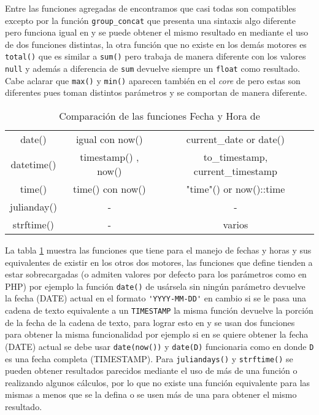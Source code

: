 Entre las funciones agregadas de \s encontramos que casi todas son compatibles excepto por la función \verb=group_concat= que presenta una sintaxis algo diferente pero funciona igual en \m y se puede obtener el mismo resultado en \p mediante el uso de dos funciones distintas, la otra función que no existe en los demás motores es \verb=total()= que es similar a \verb=sum()= pero  trabaja de manera diferente con los valores \verb=null= y además a diferencia de \verb=sum= devuelve siempre un \verb=float= como resultado. Cabe aclarar que \verb=max()= y \verb=min()= aparecen también en el \textit{core} de \s pero estas son diferentes pues toman distintos parámetros y se comportan de manera diferente.

\begin{table}[h]
\begin{center}
{
\selectfont
\begin{tabular}{|c|c|c|}
\hline 
\s & \m & \p \\ 
\hline 
date() & igual con now() & current\_date or date() \\ 
\hline 
datetime() & timestamp() , now() & to\_timestamp, current\_timestamp \\ 
\hline 
time() & time() con now() & "time"() or now()::time \\ 
\hline 
julianday() & - & - \\ 
\hline 
strftime() & - & varios \\ 
\hline 
\end{tabular} 
}
\end{center}
\caption{Comparación de las funciones Fecha y Hora de \s}
\label{table:functions:dates}
\end{table}

La tabla \ref{table:functions:dates} muestra las funciones que tiene \s para el manejo de fechas y horas y sus equivalentes de existir en los otros dos motores, las funciones que define \s tienden a estar sobrecargadas (o admiten valores por defecto para los parámetros como en PHP) por ejemplo la función \verb=date()= de usársela sin ningún parámetro devuelve la fecha (DATE) actual en el formato \verb='YYYY-MM-DD'= en cambio si se le pasa una cadena de texto equivalente a un \verb=TIMESTAMP= la misma función devuelve la porción de la fecha de la cadena de texto, para lograr esto en \m y \p se usan dos funciones para obtener la misma funcionalidad por ejemplo si en \s se quiere obtener la fecha (DATE) actual se debe usar \verb=date(now())= y \verb=date(D)= funcionaria como en \s donde \verb=D= es una fecha completa (TIMESTAMP). Para \verb=juliandays()= y \verb=strftime()= se pueden obtener resultados parecidos mediante el uso de más de una función o realizando algunos cálculos, por lo que no existe una función equivalente para las mismas a menos que se la defina o se usen  más de una para obtener el mismo resultado.

